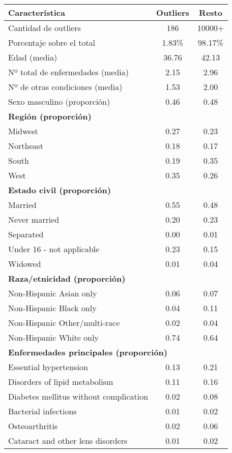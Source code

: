\documentclass[12pt,a4paper]{article}
\begin{document}
\begin{itemize}
\begin{table}[H]
\centering
\begin{tabular}{lcc}
\toprule
\textbf{Característica} & \textbf{Outliers} & \textbf{Resto} \\
\midrule
Cantidad de outliers & 186 & 10000+ \\
Porcentaje sobre el total & 1.83\% & 98.17\% \\
Edad (media) & 36.76 & 42.13 \\
Nº total de enfermedades (media) & 2.15 & 2.96 \\
Nº de otras condiciones (media) & 1.53 & 2.00 \\
Sexo masculino (proporción) & 0.46 & 0.48 \\
\midrule
\multicolumn{3}{l}{\textbf{Región (proporción)}} \\
Midwest & 0.27 & 0.23 \\
Northeast & 0.18 & 0.17 \\
South & 0.19 & 0.35 \\
West & 0.35 & 0.26 \\
\midrule
\multicolumn{3}{l}{\textbf{Estado civil (proporción)}} \\
Married & 0.55 & 0.48 \\
Never married & 0.20 & 0.23 \\
Separated & 0.00 & 0.01 \\
Under 16 - not applicable & 0.23 & 0.15 \\
Widowed & 0.01 & 0.04 \\
\midrule
\multicolumn{3}{l}{\textbf{Raza/etnicidad (proporción)}} \\
Non-Hispanic Asian only & 0.06 & 0.07 \\
Non-Hispanic Black only & 0.04 & 0.11 \\
Non-Hispanic Other/multi-race & 0.02 & 0.04 \\
Non-Hispanic White only & 0.74 & 0.64 \\
\midrule
\multicolumn{3}{l}{\textbf{Enfermedades principales (proporción)}} \\
Essential hypertension & 0.13 & 0.21 \\
Disorders of lipid metabolism & 0.11 & 0.16 \\
Diabetes mellitus without complication & 0.02 & 0.08 \\
Bacterial infections & 0.01 & 0.02 \\
Osteoarthritis & 0.02 & 0.06 \\
Cataract and other lens disorders & 0.01 & 0.02 \\

\end{tabular}
\end{table}
\end{itemize}
\end{document}
